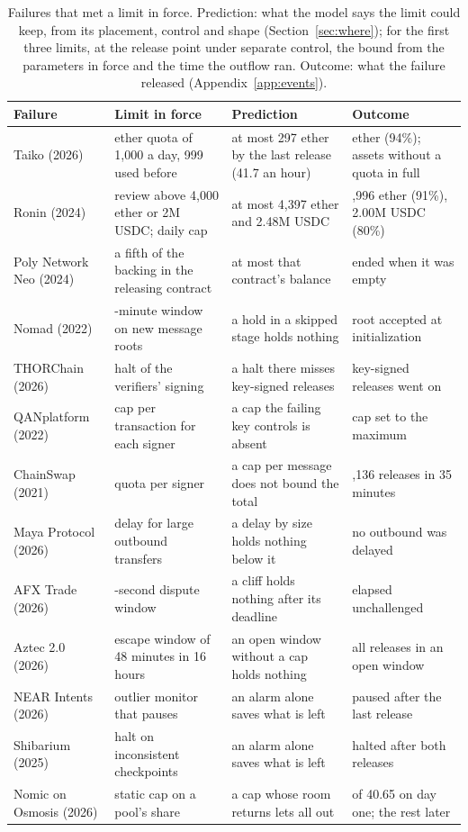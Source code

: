 \begin{table}[t]
\centering
\caption{Failures that met a limit in force. Prediction: what the model says the limit could keep, from its placement, control and shape (Section~\ref{sec:where}); for the first three limits, at the release point under separate control, the bound from the parameters in force and the time the outflow ran. Outcome: what the failure released (Appendix~\ref{app:events}).}
\label{tab:validation}
\scriptsize
\setlength{\tabcolsep}{2.5pt}
\begin{tabular}{@{}>{\raggedright\arraybackslash}p{1.42cm} >{\raggedright\arraybackslash}p{2.0cm} >{\raggedright\arraybackslash}p{2.3cm} >{\raggedright\arraybackslash}p{2.3cm}@{}}
\toprule
Failure & Limit in force & Prediction & Outcome \\
\midrule
Taiko (2026) & ether quota of 1,000 a day, 999 used before & at most 297 ether by the last release (41.7 an hour) & 278 ether (94\%); assets without a quota in full \\
Ronin (2024) & review above 4,000 ether or 2M USDC; daily cap & at most 4,397 ether and 2.48M USDC & 3,996 ether (91\%), 2.00M USDC (80\%) \\
Poly Network Neo (2024) & a fifth of the backing in the releasing contract & at most that contract's balance & ended when it was empty \\
Nomad (2022) & 30-minute window on new message roots & a hold in a skipped stage holds nothing & root accepted at initialization \\
THORChain (2026) & halt of the verifiers' signing & a halt there misses key-signed releases & key-signed releases went on \\
QANplatform (2022) & cap per transaction for each signer & a cap the failing key controls is absent & cap set to the maximum \\
ChainSwap (2021) & quota per signer & a cap per message does not bound the total & 1,136 releases in 35 minutes \\
Maya Protocol (2026) & delay for large outbound transfers & a delay by size holds nothing below it & no outbound was delayed \\
AFX Trade (2026) & 200-second dispute window & a cliff holds nothing after its deadline & elapsed unchallenged \\
Aztec 2.0 (2026) & escape window of 48 minutes in 16 hours & an open window without a cap holds nothing & all releases in an open window \\
NEAR Intents (2026) & outlier monitor that pauses & an alarm alone saves what is left & paused after the last release \\
Shibarium (2025) & halt on inconsistent checkpoints & an alarm alone saves what is left & halted after both releases \\
Nomic on Osmosis (2026) & static cap on a pool's share & a cap whose room returns lets all out & 18 of 40.65 on day one; the rest later \\
\bottomrule
\end{tabular}
\end{table}
